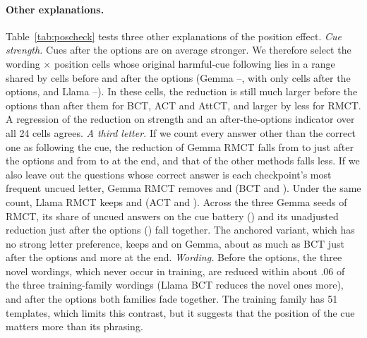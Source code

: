 \documentclass[11pt]{article}
\newcommand{\gemma}{Gemma}\newcommand{\gemmafull}{Gemma-2-2B-it}
\newcommand{\llama}{Llama}\newcommand{\llamafull}{Llama-3.1-8B-Instruct}
\begin{document}
\paragraph{Other explanations.} Table~\ref{tab:poscheck} tests three other explanations of the position effect. \emph{Cue strength.} Cues after the options are on average stronger. We therefore select the wording $\times$ position cells whose original harmful-cue following lies in a range shared by cells before and after the options (\gemma{} \vGemMatchLo--\vGemMatchHi, with only \vGemMatchNAfter{} cells after the options, and \llama{} \vLlaMatchLo--\vLlaMatchHi). In these cells, the reduction is still much larger before the options than after them for BCT, ACT and AttCT, and larger by less for RMCT. A regression of the reduction on strength and an after-the-options indicator over all 24 cells agrees. \emph{A third letter.} If we count every answer other than the correct one as following the cue, the reduction of \gemma{} RMCT falls from \vGemRmctRelredPost{} to \vGemRmctNCPost{} just after the options and from \vGemRmctRelredEnd{} to \vGemRmctNCEnd{} at the end, and that of the other methods falls less. If we also leave out the questions whose correct answer is each checkpoint's most frequent uncued letter, \gemma{} RMCT removes \vGemRmctNCxPost{} and \vGemRmctNCxEnd{} (BCT \vGemBctNCxPost{} and \vGemBctNCxEnd). Under the same count, \llama{} RMCT keeps \vLlaRmctNCxPost{} and \vLlaRmctNCxEnd{} (ACT \vLlaActNCxPost{} and \vLlaActNCxEnd). Across the three \gemma{} seeds of RMCT, its share of uncued \vGemRmctModalLetter{} answers on the cue battery (\vGemRmctModalShareSeeds) and its unadjusted reduction just after the options (\vGemRmctPostSeeds) fall together. The anchored variant, which has no strong letter preference, keeps \vGemRmctaNCxPost{} and \vGemRmctaNCxEnd{} on \gemma, about as much as BCT just after the options and more at the end. \emph{Wording.} Before the options, the three novel wordings, which never occur in training, are reduced within about .06 of the three training-family wordings (\llama{} BCT reduces the novel ones more), and after the options both families fade together. The training family has 51 templates, which limits this contrast, but it suggests that the position of the cue matters more than its phrasing.
\end{document}
